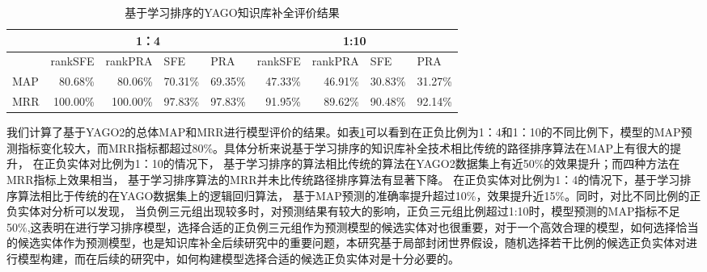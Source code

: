 \begin{table}[htbp]
  \centering
  \caption{基于学习排序的YAGO知识库补全评价结果}
    \begin{tabular}{|l|r|r|r|r|r|r|r|r|}
    \hline
          & \multicolumn{4}{c|}{1：4}      & \multicolumn{4}{c|}{1:10} \bigstrut\\
    \hline
          & \multicolumn{1}{l|}{rankSFE} & \multicolumn{1}{l|}{rankPRA} & \multicolumn{1}{l|}{SFE} & \multicolumn{1}{l|}{PRA} & \multicolumn{1}{l|}{rankSFE} & \multicolumn{1}{l|}{rankPRA} & \multicolumn{1}{l|}{SFE} & \multicolumn{1}{l|}{PRA} \bigstrut\\
    \hline
    MAP   & 80.68\% & 80.06\% & 70.31\% & 69.35\% & 47.33\% & 46.91\% & 30.83\% & 31.27\% \bigstrut\\
    \hline
    MRR   & 100.00\% & 100.00\% & 97.83\% & 97.83\% & 91.95\% & 89.62\% & 90.48\% & 92.14\% \bigstrut\\
    \hline
    \end{tabular}%
  \label{tab:kbc-yago-rank}%
\end{table}%


我们计算了基于YAGO2的总体MAP和MRR进行模型评价的结果。如表\ref{tab:kbc-yago-rank}可以看到在正负比例为1：4和1：10的不同比例下，模型的MAP预测指标变化较大，而MRR指标都超过80\%。具体分析来说基于学习排序的知识库补全技术相比传统的路径排序算法在MAP上有很大的提升，
在正负实体对比例为1：10的情况下，
基于学习排序的算法相比传统的算法在YAGO2数据集上有近50\%的效果提升；而四种方法在MRR指标上效果相当，
基于学习排序算法的MRR并未比传统路径排序算法有显著下降。
在正负实体对比例为1：4的情况下，基于学习排序算法相比于传统的在YAGO数据集上的逻辑回归算法，
基于MAP预测的准确率提升超过10\%，效果提升近15\%。同时，对比不同比例的正负实体对分析可以发现，
当负例三元组出现较多时，对预测结果有较大的影响，正负三元组比例超过1:10时，模型预测的MAP指标不足50\%,这表明在进行学习排序模型，选择合适的正负例三元组作为预测模型的候选实体对也很重要，对于一个高效合理的模型，如何选择恰当的候选实体作为预测模型，也是知识库补全后续研究中的重要问题，本研究基于局部封闭世界假设，随机选择若干比例的候选正负实体对进行模型构建，而在后续的研究中，如何构建模型选择合适的候选正负实体对是十分必要的。

